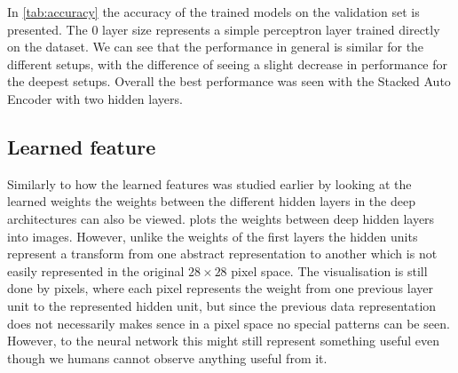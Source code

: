 \documentclass{article}
\begin{document}
In \cref{tab:accuracy} the accuracy of the trained models on the validation set is presented.
The 0 layer size represents a simple perceptron layer trained directly on the dataset.
We can see that the performance in general is similar for the different setups,
with the difference of seeing a slight decrease in performance for the deepest setups.
Overall the best performance was seen with the Stacked Auto Encoder with two hidden layers.

\subsection{Learned feature}
Similarly to how the learned features was studied earlier by looking at the learned weights
the weights between the different hidden layers in the deep architectures can also be viewed.
 plots the weights between deep hidden layers into images.
However, unlike the weights of the first layers the hidden units represent a transform
from one abstract representation to another
which is not easily represented in the original $28 \times 28$ pixel space.
The visualisation is still done by pixels,
where each pixel represents the weight from one previous layer unit to the represented hidden unit,
but since the previous data representation does not necessarily makes sence in a pixel space
no special patterns can be seen.
However, to the neural network this might still represent something useful
even though we humans cannot observe anything useful from it.
\end{document}
